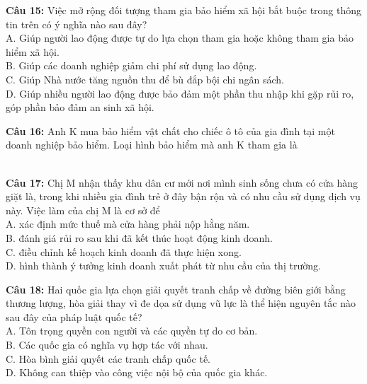 \documentclass[12pt,a4paper]{article}
\begin{document}
\noindent \textbf{Câu 15:} Việc mở rộng đối tượng tham gia bảo hiểm xã hội bắt buộc trong thông tin trên có ý nghĩa nào sau đây?\\
\noindent A. Giúp người lao động được tự do lựa chọn tham gia hoặc không tham gia bảo hiểm xã hội.\\
\noindent B. Giúp các doanh nghiệp giảm chi phí sử dụng lao động.\\
\noindent C. Giúp Nhà nước tăng nguồn thu để bù đắp bội chi ngân sách.\\
\noindent D. Giúp nhiều người lao động được bảo đảm một phần thu nhập khi gặp rủi ro, góp phần bảo đảm an sinh xã hội.

\noindent \textbf{Câu 16:} Anh K mua bảo hiểm vật chất cho chiếc ô tô của gia đình tại một doanh nghiệp bảo hiểm. Loại hình bảo hiểm mà anh K tham gia là\\
\noindent{}\\
\noindent{}

\noindent \textbf{Câu 17:} Chị M nhận thấy khu dân cư mới nơi mình sinh sống chưa có cửa hàng giặt là, trong khi nhiều gia đình trẻ ở đây bận rộn và có nhu cầu sử dụng dịch vụ này. Việc làm của chị M là cơ sở để\\
\noindent A. xác định mức thuế mà cửa hàng phải nộp hằng năm.\\
\noindent B. đánh giá rủi ro sau khi đã kết thúc hoạt động kinh doanh.\\
\noindent C. điều chỉnh kế hoạch kinh doanh đã thực hiện xong.\\
\noindent D. hình thành ý tưởng kinh doanh xuất phát từ nhu cầu của thị trường.

\noindent \textbf{Câu 18:} Hai quốc gia lựa chọn giải quyết tranh chấp về đường biên giới bằng thương lượng, hòa giải thay vì đe dọa sử dụng vũ lực là thể hiện nguyên tắc nào sau đây của pháp luật quốc tế?\\
\noindent A. Tôn trọng quyền con người và các quyền tự do cơ bản.\\
\noindent B. Các quốc gia có nghĩa vụ hợp tác với nhau.\\
\noindent C. Hòa bình giải quyết các tranh chấp quốc tế.\\
\noindent D. Không can thiệp vào công việc nội bộ của quốc gia khác.
\end{document}
